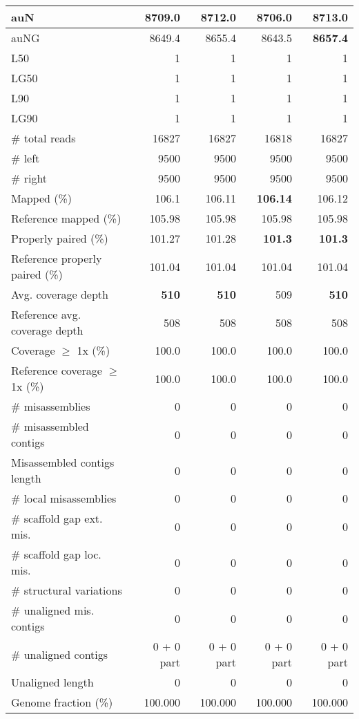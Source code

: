 \documentclass[12pt,a4paper]{article}
\begin{document}
\begin{table}[ht]
\begin{center}
\begin{tabular}{|l*{4}{|r}|}
auN & 8709.0 & 8712.0 & 8706.0 & {\bf 8713.0} \\ \hline
auNG & 8649.4 & 8655.4 & 8643.5 & {\bf 8657.4} \\ \hline
L50 & 1 & 1 & 1 & 1 \\ \hline
LG50 & 1 & 1 & 1 & 1 \\ \hline
L90 & 1 & 1 & 1 & 1 \\ \hline
LG90 & 1 & 1 & 1 & 1 \\ \hline
\# total reads & 16827 & 16827 & 16818 & 16827 \\ \hline
\# left & 9500 & 9500 & 9500 & 9500 \\ \hline
\# right & 9500 & 9500 & 9500 & 9500 \\ \hline
Mapped (\%) & 106.1 & 106.11 & {\bf 106.14} & 106.12 \\ \hline
Reference mapped (\%) & 105.98 & 105.98 & 105.98 & 105.98 \\ \hline
Properly paired (\%) & 101.27 & 101.28 & {\bf 101.3} & {\bf 101.3} \\ \hline
Reference properly paired (\%) & 101.04 & 101.04 & 101.04 & 101.04 \\ \hline
Avg. coverage depth & {\bf 510} & {\bf 510} & 509 & {\bf 510} \\ \hline
Reference avg. coverage depth & 508 & 508 & 508 & 508 \\ \hline
Coverage $\geq$ 1x (\%) & 100.0 & 100.0 & 100.0 & 100.0 \\ \hline
Reference coverage $\geq$ 1x (\%) & 100.0 & 100.0 & 100.0 & 100.0 \\ \hline
\# misassemblies & 0 & 0 & 0 & 0 \\ \hline
\# misassembled contigs & 0 & 0 & 0 & 0 \\ \hline
Misassembled contigs length & 0 & 0 & 0 & 0 \\ \hline
\# local misassemblies & 0 & 0 & 0 & 0 \\ \hline
\# scaffold gap ext. mis. & 0 & 0 & 0 & 0 \\ \hline
\# scaffold gap loc. mis. & 0 & 0 & 0 & 0 \\ \hline
\# structural variations & 0 & 0 & 0 & 0 \\ \hline
\# unaligned mis. contigs & 0 & 0 & 0 & 0 \\ \hline
\# unaligned contigs & 0 + 0 part & 0 + 0 part & 0 + 0 part & 0 + 0 part \\ \hline
Unaligned length & 0 & 0 & 0 & 0 \\ \hline
Genome fraction (\%) & 100.000 & 100.000 & 100.000 & 100.000 \\ \hline

\end{tabular}
\end{center}
\end{table}
\end{document}

